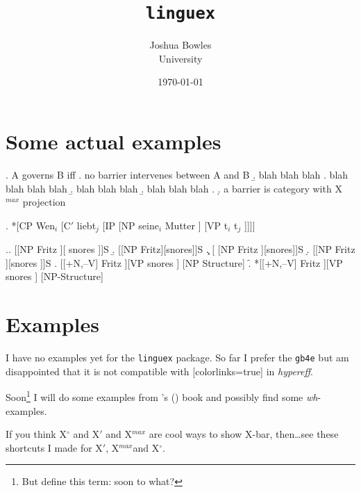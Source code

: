 \documentclass[11pt]{article}
\newcommand{\wh}{\emph{wh}}
\newcommand{\oxbar}{{\sc X$^{\circ}$}}
\newcommand{\ixbar}{{\sc X$'$}}
\newcommand{\maxbar}{{\sc X$^{max}$}}
\newcommand{\posscitet}[1]{\citeauthor{#1}'s (\citeyear{#1})}
\theoremstyle{plain}
\theoremstyle{definition}
\newtheorem{phrase string}{Phrase String}
\begin{document}
 
\title{\texttt{linguex}}

\author{Joshua Bowles\\
University}
\date{\today}
\maketitle

\section{Some actual examples}

\ex. A governs B iff
\a. no barrier intervenes between A and B
\b. blah blah blah
\a. blah blah blah blah
\b. blah blah blah
\b. blah blah blah
\z.
\d. a barrier is category with \maxbar{} projection


\exi. *[CP Wen$_{i}$ [C$'$ liebt$_{j}$ [IP [NP seine$_{i}$ Mutter ]%
[VP t$_{i}$ t$_{j}$ ]]]]

\exi.\a. [[NP Fritz ][ snores ]]S
\b. [[NP Fritz][snores]]S
\c. [ [NP Fritz ][snores]]S
\d. [[NP Fritz {][}snores ]]S
\e. {[[+N,--V]} Fritz ][VP snores ] \hfill{} [NP Structure]
\f. *[{}[+N,--V] Fritz ][VP snores ] \hfill [NP-Structure]


\section{Examples}
I have no examples yet for the \texttt{linguex} package. So far I prefer the {\tt gb4e} but am disappointed that it is not compatible with [colorlinks=true] in {{\sl hypereff}}.

Soon\footnote{But define this term: soon to what?} I will do some examples from \posscitet{chomsky86knowledge} book and possibly find some \wh-examples. 

If you think {\sc X$^{\circ}$} and {\sc X$'$} and {\sc X$^{max}$} are cool ways to show X-bar, then\ldots see these shortcuts I made for \ixbar , \maxbar and \oxbar.

\newpage
%

\end{document}

